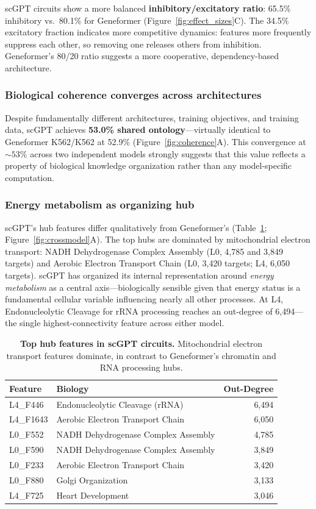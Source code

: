 \documentclass[onecolumn]{article}
\begin{document}
scGPT circuits show a more balanced \textbf{inhibitory/excitatory ratio}: 65.5\% inhibitory vs.\ 80.1\% for Geneformer (Figure~\ref{fig:effect_sizes}C). The 34.5\% excitatory fraction indicates more competitive dynamics: features more frequently suppress each other, so removing one releases others from inhibition. Geneformer's 80/20 ratio suggests a more cooperative, dependency-based architecture.


\subsubsection{Biological coherence converges across architectures}

Despite fundamentally different architectures, training objectives, and training data, scGPT achieves \textbf{53.0\% shared ontology}---virtually identical to Geneformer K562/K562 at 52.9\% (Figure~\ref{fig:coherence}A). This convergence at ${\sim}53\%$ across two independent models strongly suggests that this value reflects a property of biological knowledge organization rather than any model-specific computation.


\subsubsection{Energy metabolism as organizing hub}

scGPT's hub features differ qualitatively from Geneformer's (Table~\ref{tab:hubs_scgpt}; Figure~\ref{fig:crossmodel}A). The top hubs are dominated by mitochondrial electron transport: NADH Dehydrogenase Complex Assembly (L0, 4,785 and 3,849 targets) and Aerobic Electron Transport Chain (L0, 3,420 targets; L4, 6,050 targets). scGPT has organized its internal representation around \emph{energy metabolism} as a central axis---biologically sensible given that energy status is a fundamental cellular variable influencing nearly all other processes. At L4, Endonucleolytic Cleavage for rRNA processing reaches an out-degree of 6,494---the single highest-connectivity feature across either model.

\begin{table}[t]
\centering
\caption{\textbf{Top hub features in scGPT circuits.} Mitochondrial electron transport features dominate, in contrast to Geneformer's chromatin and RNA processing hubs.}
\label{tab:hubs_scgpt}
\smallskip
\begin{tabular}{llr}
\toprule
Feature & Biology & Out-Degree \\
\midrule
L4\_F446 & Endonucleolytic Cleavage (rRNA) & 6,494 \\
L4\_F1643 & Aerobic Electron Transport Chain & 6,050 \\
L0\_F552 & NADH Dehydrogenase Complex Assembly & 4,785 \\
L0\_F590 & NADH Dehydrogenase Complex Assembly & 3,849 \\
L0\_F233 & Aerobic Electron Transport Chain & 3,420 \\
L0\_F880 & Golgi Organization & 3,133 \\
L4\_F725 & Heart Development & 3,046 \\
\bottomrule
\end{tabular}
\end{table}
\end{document}
